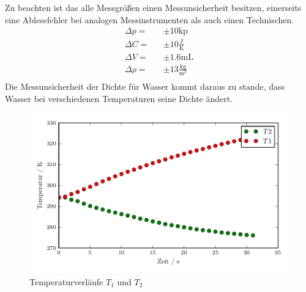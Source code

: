 Zu beachten ist das alle Messgrößen einen Messunsicherheit besitzen, einerseits eine Ablesefehler bei analogen Messinstrumenten als auch einen Technischen.
\begin{eqnarray*}
  \Delta p =& &\pm 10 \text{kp}				\\
  \Delta C =& &\pm 10 \frac{\text{J}}{\text{K}}		\\
  \Delta V =& &\pm 1.6 \text{mL}				\\
  \Delta \rho =& &\pm 13 \frac{\text{kg}}{\text{m$^2$}}	\\
\end{eqnarray*}
Die Messunsicherheit der Dichte für Wasser kommt daraus zu stande, dass Wasser bei verschiedenen Temperaturen seine Dichte ändert.
\begin{figure}
  \centering
  \includegraphics[width=\textwidth]{TVerlauf.pdf}
  \caption{Temperaturverläufe $T_\text{1}$ und $T_\text{2}$}
  \label{fig:T1&T2}
\end{figure}
